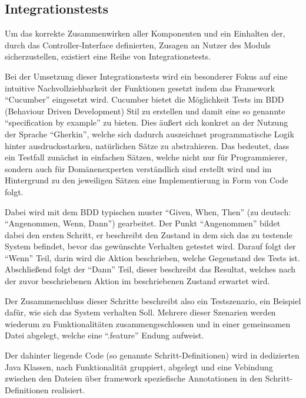 \subsection{Integrationstests}\label{subsec:integrationstests}
Um das korrekte Zusammenwirken aller Komponenten und ein Einhalten der,
durch das Controller-Interface definierten, Zusagen an Nutzer des Moduls sicherzustellen,
existiert eine Reihe von Integrationstests.

Bei der Umsetzung dieser Integrationstests wird ein besonderer Fokus auf eine intuitive
Nachvollziehbarkeit der Funktionen gesetzt indem das Framework \enquote{Cucumber} eingesetzt wird.
Cucumber bietet die Möglichkeit Tests im BDD (Behaviour Driven Development) Stil zu erstellen und
damit eine so genannte \enquote{specification by example} zu bieten.
Dies äußert sich konkret an der Nutzung der Sprache \enquote{Gherkin}, welche sich dadurch auszeichnet
programmatische Logik hinter ausdrucksstarken, natürlichen Sätze zu abstrahieren.
Das bedeutet, dass ein Testfall zunächst in einfachen Sätzen, welche nicht nur für Programmierer,
sondern auch für Domänenexperten verständlich sind erstellt wird und im Hintergrund zu den
jeweiligen Sätzen eine Implementierung in Form von Code folgt.

Dabei wird mit dem BDD typischen muster \enquote{Given, When, Then} (zu deutsch: \enquote{Angenommen, Wenn, Dann})
gearbeitet.
Der Punkt \enquote{Angenommen} bildet dabei den ersten Schritt, er beschreibt den Zustand in dem sich
das zu testende System befindet, bevor das gewünschte Verhalten getestet wird.
Darauf folgt der \enquote{Wenn} Teil, darin wird die Aktion beschrieben, welche Gegenstand des Tests ist.
Abschließend folgt der \enquote{Dann} Teil, dieser beschreibt das Resultat, welches nach der zuvor beschriebenen
Aktion im beschriebenen Zustand erwartet wird.

Der Zusammenschluss dieser Schritte beschreibt also ein Testszenario, ein Beispiel dafür, wie sich
das System verhalten Soll.
Mehrere dieser Szenarien werden wiederum zu Funktionalitäten zusammengeschlossen und in einer
gemeinsamen Datei abgelegt, welche eine \enquote{.feature} Endung aufweist.

Der dahinter liegende Code (so genannte Schritt-Definitionen) wird in dedizierten Java Klassen,
nach Funktionalität gruppiert, abgelegt und eine Vebindung zwischen den Dateien über
framework speziefische Annotationen in den Schritt-Definitionen realisiert.
